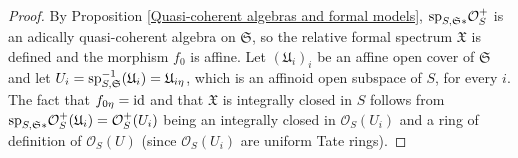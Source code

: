 \documentclass[12pt,twoside,a4paper]{article}
\theoremstyle{definition}
\theoremstyle{remark}
\newcommand\id{{\rm id}}
\newcommand\spc{{\rm sp}}
\begin{document}
\begin{proof}By Proposition \ref{Quasi-coherent algebras and formal models}, $\spc_{S,\mathfrak{S}\ast}\mathcal{O}_{S}^{+}$ is an adically quasi-coherent algebra on $\mathfrak{S}$, so the relative formal spectrum $\mathfrak{X}$ is defined and the morphism $f_{0}$ is affine. Let $(\mathfrak{U}_{i})_{i}$ be an affine open cover of $\mathfrak{S}$ and let $U_{i}=\spc_{S,\mathfrak{S}}^{-1}(\mathfrak{U}_{i})=\mathfrak{U}_{i\eta}$, which is an affinoid open subspace of $S$, for every $i$. The fact that $f_{0\eta}=\id$ and that $\mathfrak{X}$ is integrally closed in $S$ follows from $\spc_{S,\mathfrak{S}\ast}\mathcal{O}_{S}^{+}(\mathfrak{U}_{i})=\mathcal{O}_{S}^{+}(U_{i})$ being an integrally closed in $\mathcal{O}_{S}(U_{i})$ and a ring of definition of $\mathcal{O}_{S}(U)$ (since $\mathcal{O}_{S}(U_{i})$ are uniform Tate rings). 


\end{proof}
\end{document}
